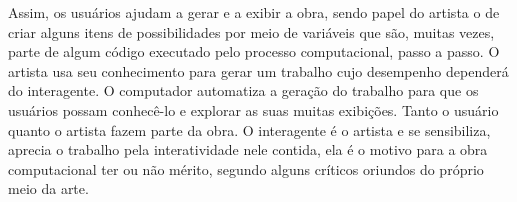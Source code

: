 Assim, os usuários ajudam a gerar e a exibir a obra, sendo papel do artista o de criar alguns itens de possibilidades por meio de variáveis que são, muitas vezes, parte de algum código executado pelo processo computacional, passo a passo. O artista usa seu conhecimento para gerar um trabalho cujo desempenho dependerá do interagente. O computador automatiza a geração do trabalho para que os usuários possam conhecê-lo e explorar as suas muitas exibições. Tanto o usuário quanto o artista fazem parte da obra. O interagente é o artista e se sensibiliza, aprecia o trabalho pela interatividade nele contida, ela é o motivo para a obra computacional ter ou não mérito, segundo alguns críticos oriundos do próprio meio da arte.  \cite[p. 139]{venturelli}

